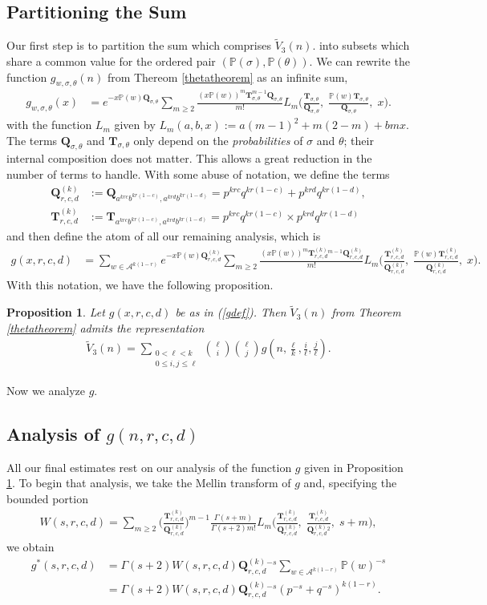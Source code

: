 \documentclass[proceedings]{aofa}
\newtheorem{proposition}{Proposition}
\newcommand{\Tst}{\textbf{T}_{\sigma,\theta}}
\newcommand{\gt}{g_{w,\sigma,\theta}}
\newcommand{\pro}{\mathbb{P}}
\newcommand{\A}{\mathcal{A}}
\newcommand{\Ptheta}{\pro(\theta)}
\newcommand{\Psigma}{\pro(\sigma)}
\newcommand{\Pw}{\pro(w)}
\newcommand{\Qst}{\textbf{Q}_{\sigma,\theta}}
\newcommand{\Qk}{\textbf{Q}_{r,c,d}^{(k)}}
\newcommand{\Tk}{\textbf{T}_{r,c,d}^{(k)}}
\newcommand{\gs}{g^{*}}
\newcommand{\Vtt}{\widetilde{V}_{3}}
\begin{document}
\subsection{Partitioning the Sum}
Our first step is to partition the sum which comprises $\Vtt(n)$. 
into subsets which share a common value for the ordered pair $(\Psigma,\Ptheta)$. We can rewrite the function $\gt(n)$ from Thereom \ref{thetatheorem} as an infinite sum, 
\begin{align*}
\gt(x)&=e^{-x\Pw\Qst}\sum_{ m \geq 2}\frac{(x\Pw)^{m}\Tst^{m-1}\Qst}{m!}L_{m}\Big(\frac{\Tst}{\Qst}, \;\frac{\Pw\Tst}{\Qst},\;x\Big).
\end{align*}
with the function $L_{m}$  given by
$L_{m}(a,b,x):=a(m-1)^{2} +m(2-m)+bmx$.
The terms $\Qst$ and $\Tst$ only depend on the \emph{probabilities} of $\sigma$ and $\theta$; their internal composition does not matter. This allows a great reduction in the number of terms to handle. With some abuse of notation, we define the terms
\begin{align*}
\textbf{Q}_{r,c,d}^{(k)} &:= \textbf{Q}_{a^{krc}b^{kr(1-c)},a^{krd}b^{kr(1-d)}} = p^{krc}q^{kr(1-c)}+p^{krd}q^{kr(1-d)},\\
\Tk&:=\textbf{T}_{a^{krc}b^{kr(1-c)},a^{krd}b^{kr(1-d)}}=p^{krc}q^{kr(1-c)} \times p^{krd}q^{kr(1-d)}
\end{align*}
and then define the atom of all our remaining analysis, which is
\begin{align}\label{gdef}
g(x,r,c,d)&=\sum_{w \in \A^{k(1-r)}}e^{-x\Pw\Qk}\sum_{ m \geq 2}\frac{(x\Pw)^{m}\Tk{}^{m-1}\Qk}{m!}L_{m}\Big(\frac{\Tk}{\Qk}, \;\frac{\Pw\Tk}{\Qk},\;x\Big).
\end{align}
With this notation, we have the following proposition.
\begin{proposition}\label{gprop}
Let $g(x,r,c,d)$ be as in (\ref{gdef}). Then $\Vtt(n)$ from Theorem \ref{thetatheorem} admits the representation \begin{align}\label{hsum}
\Vtt(n)=\sum_{\substack{0 < \ell < k \\ 0 \leq i,j \leq \ell}} {\ell \choose i}{\ell \choose j}g(n,\tfrac{\ell}{k},\tfrac{i}{\ell},\tfrac{j}{\ell}).
\end{align}
\end{proposition}
Now we analyze $g$.
\subsection{Analysis of $g(n,r,c,d)$}
All our final estimates rest on our analysis of the function $g$ given in Proposition \ref{gprop}. To begin that analysis, we take the Mellin transform of $g$ and, specifying the bounded portion
\begin{align*}
W(s,r,c,d)=\sum_{m \geq 2} \Big(\frac{\Tk}{\Qk}\Big)^{m-1}\frac{\Gamma(s+m)}{\Gamma(s+2) m!} L_{m}\Big(\frac{\Tk}{\Qk}, \;\frac{\Tk}{\Qk{}^{2}},\;s+m\Big),
\end{align*}
we obtain
\begin{align*}
\gs(s,r,c,d)&=\Gamma(s+2)W(s,r,c,d)\Qk{}^{-s}\sum_{w \in \A^{k(1-r)}}\Pw^{-s}\\
&=\Gamma(s+2)W(s,r,c,d)\Qk{}^{-s}(p^{-s}+q^{-s})^{k(1-r)}.
\end{align*}
\end{document}
